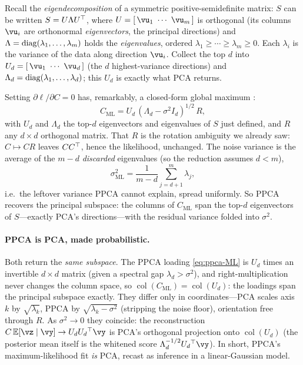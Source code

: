 \documentclass[11pt]{article}
\theoremstyle{plain}
\theoremstyle{definition}
\theoremstyle{remark}
\theoremstyle{definition}
\newcommand{\E}{\mathbb{E}}
\DeclareMathOperator{\col}{col}
\begin{document}
Recall the \emph{eigendecomposition} of a symmetric positive-semidefinite matrix:
$S$ can be written $S = U \Lambda U{^\top}$, where $U = [\,\vu_1\ \cdots\ \vu_m\,]$
is orthogonal (its columns $\vu_i$ are orthonormal \emph{eigenvectors}, the
principal directions) and $\Lambda = \operatorname{diag}(\lambda_1, \dots, \lambda_m)$ holds
the \emph{eigenvalues}, ordered $\lambda_1 \geq \cdots \geq \lambda_m \geq 0$.
Each $\lambda_i$ is the variance of the data along direction $\vu_i$. Collect the
top $d$ into $U_d = [\,\vu_1\ \cdots\ \vu_d\,]$ (the $d$ highest-variance
directions) and $\Lambda_d = \operatorname{diag}(\lambda_1, \dots, \lambda_d)$; this
$U_d$ is exactly what PCA returns.

Setting $\partial\ell/\partial C = 0$ has, remarkably, a closed-form global
maximum \parencite{Tipping1999-cv}:
\begin{equation}\label{eq:ppca-ML}
    C_{\mathrm{ML}} = U_d\,(\Lambda_d - \sigma^2 I_d)^{1/2}\,R,
\end{equation}
with $U_d$ and $\Lambda_d$ the top-$d$ eigenvectors and eigenvalues of $S$ just
defined, and $R$ any $d \times d$ orthogonal matrix. That $R$ is the rotation ambiguity we
already saw: $C \mapsto CR$ leaves $C C{^\top}$, hence the likelihood, unchanged.
The noise variance is the average of the $m-d$ \emph{discarded} eigenvalues (so
the reduction assumes $d < m$),
\begin{equation}\label{eq:ppca-sigmaML}
    \sigma^2_{\mathrm{ML}} = \frac{1}{m - d}\sum_{j = d+1}^{m} \lambda_j ,
\end{equation}
i.e.\ the leftover variance PPCA cannot explain, spread uniformly. So PPCA
recovers the principal subspace: the columns of $C_{\mathrm{ML}}$ span the
top-$d$ eigenvectors of $S$---exactly PCA's directions---with the residual
variance folded into $\sigma^2$.

\paragraph{PPCA is PCA, made probabilistic.}
Both return the \emph{same subspace}. The PPCA loading \eqref{eq:ppca-ML} is $U_d$
times an invertible $d \times d$ matrix (given a spectral gap $\lambda_d >
\sigma^2$), and right-multiplication never changes the column space, so
$\col(C_{\mathrm{ML}}) = \col(U_d)$: the loadings span the principal subspace
exactly. They differ only in coordinates---PCA scales axis $k$ by
$\sqrt{\lambda_k}$, PPCA by $\sqrt{\lambda_k - \sigma^2}$ (stripping the noise
floor), orientation free through $R$. As $\sigma^2 \to 0$ they coincide: the
reconstruction $C\,\E[\vz \mid \vy] \to U_d U_d\trp \vy$ is PCA's orthogonal
projection onto $\col(U_d)$ (the posterior mean itself is the whitened score
$\Lambda_d^{-1/2} U_d\trp \vy$). In short, PPCA's maximum-likelihood fit \emph{is}
PCA, recast as inference in a linear-Gaussian model.
\end{document}
